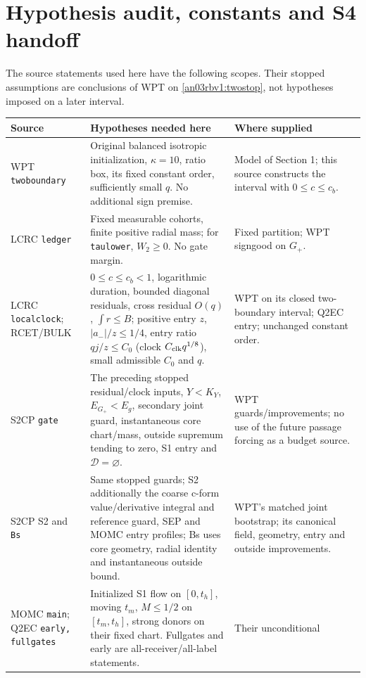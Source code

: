 \documentclass[11pt]{article}
\numberwithin{equation}{section}
\theoremstyle{remark}\newtheorem{remark}[theorem]{Remark}
\newcommand{\Gp}{G_+}
\begin{document}
\section{Hypothesis audit, constants and S4 handoff}
\label{an03rbv1:audit}
The source statements used here have the following scopes. Their
stopped assumptions are conclusions of WPT on \eqref{an03rbv1:twostop},
not hypotheses imposed on a later interval.
\begin{longtable}{>{\raggedright\arraybackslash}p{}
 >{\raggedright\arraybackslash}p{}
 >{\raggedright\arraybackslash}p{}}
\toprule
Source & Hypotheses needed here & Where supplied\\\midrule
WPT \texttt{twoboundary} & Original balanced isotropic initialization,
$\kappa=10$, ratio box, its fixed constant order, sufficiently small $q$.
No additional sign premise. & Model of Section 1; this source constructs
the interval with $0\le c\le c_b$.\\[4pt]
LCRC \texttt{ledger} & Fixed measurable cohorts, finite positive radial
mass; for \texttt{taulower}, $W_2\ge0$. No gate margin.
& Fixed partition; WPT signgood on $\Gp$.\\[4pt]
LCRC \texttt{localclock}; RCET/BULK & $0\le c\le c_b<1$, logarithmic
duration, bounded diagonal residuals, cross residual $O(q)$,
$\int r\le B$; positive entry $z$, $|a_-|/z\le1/4$,
entry ratio $qj/z\le C_0$ (clock $C_{\rm clk}q^{1/8}$),
small admissible $C_0$ and $q$. & WPT on its closed two-boundary
interval; Q2EC entry; unchanged constant order.\\[4pt]
S2CP \texttt{gate} & The preceding stopped residual/clock inputs,
$Y<K_Y$, $E_{\Gp}<E_g$, secondary joint guard, instantaneous core
chart/mass, outside supremum tending to zero, S1 entry and
$\mathcal D=\varnothing$. & WPT guards/improvements; no use of
the future passage forcing as a budget source.\\[4pt]
S2CP S2 and \texttt{Bs} & Same stopped guards; S2 additionally the
coarse c-form value/derivative integral and reference guard, SEP
and MOMC entry profiles; Bs uses core geometry, radial identity
and instantaneous outside bound. & WPT's matched joint bootstrap;
its canonical field, geometry, entry and outside improvements.\\[4pt]
MOMC \texttt{main}; Q2EC \texttt{early, fullgates} & Initialized
S1 flow on $[0,t_h]$, moving $t_m$, $M\le1/2$ on
$[t_m,t_h]$, strong donors on their fixed chart. Fullgates and
early are all-receiver/all-label statements. & Their unconditional

\end{longtable}
\end{document}

